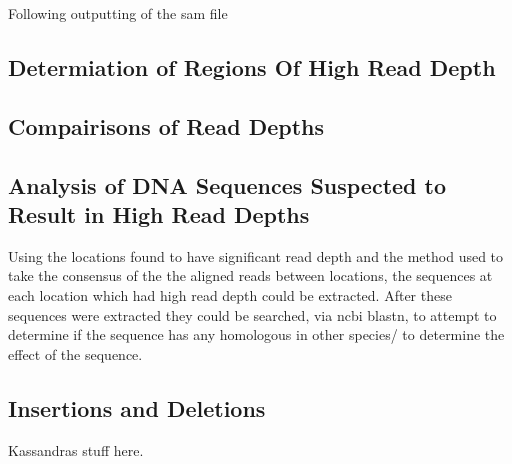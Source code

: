 \documentclass[../main.tex]{subfiles}
\begin{document}
	Following outputting of the sam file

\subsection{Determiation of Regions Of High Read Depth}

\subsection{Compairisons of Read Depths}
	

\subsection{Analysis of DNA Sequences Suspected to Result in High Read Depths}
	Using the locations found to have significant read depth and the method used to take the consensus of the the aligned reads between locations, the sequences at each location which had high read depth could be extracted. After these sequences were extracted they could be searched, via ncbi blastn, to attempt to determine if the sequence has any homologous in other species/ to determine the effect of the sequence.

\subsection{Insertions and Deletions}

	Kassandras stuff here.
\end{document}
